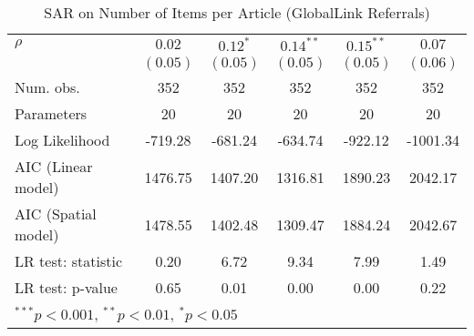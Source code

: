 \begin{table}[!h]
\begin{center}
\begin{tabular}{l c c c c c }
$\rho$                  & $0.02$       & $0.12^{*}$   & $0.14^{**}$  & $0.15^{**}$  & $0.07$       \\
                        & $(0.05)$     & $(0.05)$     & $(0.05)$     & $(0.05)$     & $(0.06)$     \\
\midrule
Num. obs.               & 352          & 352          & 352          & 352          & 352          \\
Parameters              & 20           & 20           & 20           & 20           & 20           \\
Log Likelihood          & -719.28      & -681.24      & -634.74      & -922.12      & -1001.34     \\
AIC (Linear model)      & 1476.75      & 1407.20      & 1316.81      & 1890.23      & 2042.17      \\
AIC (Spatial model)     & 1478.55      & 1402.48      & 1309.47      & 1884.24      & 2042.67      \\
LR test: statistic      & 0.20         & 6.72         & 9.34         & 7.99         & 1.49         \\
LR test: p-value        & 0.65         & 0.01         & 0.00         & 0.00         & 0.22         \\
\bottomrule
\multicolumn{6}{l}{\scriptsize{$^{***}p<0.001$, $^{**}p<0.01$, $^*p<0.05$}}
\end{tabular}
\caption{SAR on Number of Items per Article (GlobalLink Referrals)}
\label{table:coefficients}
\end{center}
\end{table}
